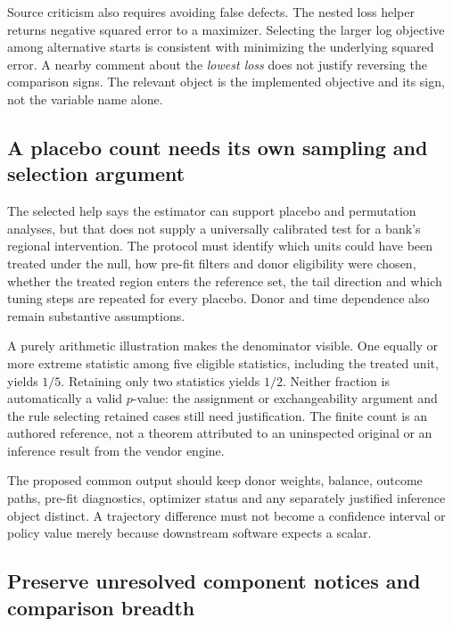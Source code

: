 Source criticism also requires avoiding false defects. The nested loss helper
returns negative squared error to a maximizer. Selecting the larger log
objective among alternative starts is consistent with minimizing the underlying
squared error. A nearby comment about the \emph{lowest loss} does not justify
reversing the comparison signs. The relevant object is the implemented objective
and its sign, not the variable name alone.\citep{exec19_synth_stata_source}

\subsection{A placebo count needs its own sampling and selection argument}
\label{exec19:synth-inference}

The selected help says the estimator can support placebo and permutation
analyses, but that does not supply a universally calibrated test for a bank's
regional intervention. The protocol must identify which units could have been
treated under the null, how pre-fit filters and donor eligibility were chosen,
whether the treated region enters the reference set, the tail direction and
which tuning steps are repeated for every placebo. Donor and time dependence
also remain substantive assumptions.

A purely arithmetic illustration makes the denominator visible. One equally or
more extreme statistic among five eligible statistics, including the treated
unit, yields $1/5$. Retaining only two statistics yields $1/2$. Neither fraction
is automatically a valid $p$-value: the assignment or exchangeability argument
and the rule selecting retained cases still need justification. The finite count
is an authored reference, not a theorem attributed to an uninspected original
or an inference result from the vendor engine.\citep{exec19_synth_contract_reference}

The proposed common output should keep donor weights, balance, outcome paths,
pre-fit diagnostics, optimizer status and any separately justified inference
object distinct. A trajectory difference must not become a confidence interval
or policy value merely because downstream software expects a scalar.

\subsection{Preserve unresolved component notices and comparison breadth}
\label{exec19:synth-rights}

